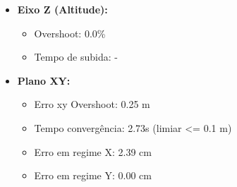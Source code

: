 \begin{itemize}
  \item \textbf{Eixo Z (Altitude):}
  \begin{itemize}
    \item Overshoot: 0.0\%
    \item Tempo de subida: -  
  \end{itemize}
  \item \textbf{Plano XY:}
  \begin{itemize}
    \item Erro xy Overshoot: 0.25 m
    \item Tempo convergência: 2.73s (limiar <= 0.1 m)
    \item Erro em regime X: 2.39 cm
    \item Erro em regime Y: 0.00 cm
  \end{itemize}
\end{itemize}
